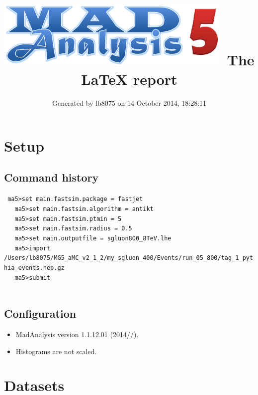 \documentclass[a4paper, 11pt]{article}
\title{{\includegraphics[scale=.4]{logo.png}}\ The LaTeX report}
\author{Generated by lb8075 on 14 October 2014, 18:28:11}
\begin{document}
\maketitle
\flushbottom

\newpage
\section{ Setup}

\subsection{ Command history}

\texttt{ ma5>set main.fastsim.package = fastjet\\
}
\texttt{ }\texttt{ }\texttt{ ma5>set main.fastsim.algorithm = antikt\\
}
\texttt{ }\texttt{ }\texttt{ ma5>set main.fastsim.ptmin = 5\\
}
\texttt{ }\texttt{ }\texttt{ ma5>set main.fastsim.radius = 0.5\\
}
\texttt{ }\texttt{ }\texttt{ ma5>set main.outputfile = sgluon800\_8TeV.lhe\\
}
\texttt{ }\texttt{ }\texttt{ ma5>import /\-Users/\-lb8075/\-MG5\_aMC\_v2\_1\_2/\-my\_sgluon\_400/\-Events/\-run\_05\_800/\-tag\_1\_pythia\_events.hep.gz\\
}
\texttt{ }\texttt{ }\texttt{ ma5>submit\\
}
\texttt{ }\texttt{ }\subsection{ Configuration}

\begin{itemize}
  \item MadAnalysis version 1.1.12.01 (2014//).
   \item Histograms are not scaled.
 
\end{itemize}
\newpage
\section{ Datasets}
\end{document}
